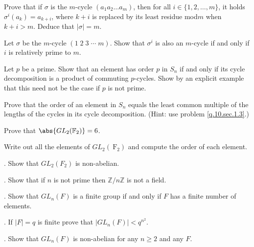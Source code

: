 \begin{questions}
\question\label{q.10.sec.1.3}
Prove that if \(\sigma\) is the \(m\)-cycle \(\left(a_1 a_2 \ldots a_m\right)\), then for all \(i \in\{1,2, \ldots, m\}\), it holds \(\sigma^i\left(a_k\right)=a_{k+i}\), where \(k+i\) is replaced by its least residue mod\;\(m\) when \(k+i>m\). Deduce that \(|\sigma|=m\).

\question
Let \(\sigma\) be the \(m\)-cycle \((1\; 2\; 3\; \cdots\; m)\). Show that \(\sigma^i\) is also an \(m\)-cycle if and only if \(i\) is relatively prime to \(m\).


\question
Let \(p\) be a prime. Show that an element has order \(p\) in \(S_n\) if and only if its cycle decomposition is a product of commuting \(p\)-cycles. Show by an explicit example that this need not be the case if \(p\) is not prime.

\question
Prove that the order of an element in \(S_n\) equals the least common multiple of the lengths of the cycles in its cycle decomposition. (Hint: use problem \ref{q.10.sec.1.3}.)


\question
Prove that \(\abs{GL_2(\mathbb{F}_2)} = 6\).




\question
Write out all the elements of \(G L_2\left(\mathrm{~F}_2\right)\) and compute the order of each element.

. Show that \(G L_2\left(F_2\right)\) is non-abelian.

. Show that if \(n\) is not prime then \(\mathbb{Z} / n \mathbb{Z}\) is not a field.

. Show that \(G L_n(F)\) is a finite group if and only if \(F\) has a finite number of elements.

. If \(|F|=q\) is finite prove that \(\left|G L_n(F)\right|<q^{n^2}\).

. Show that \(G L_n(F)\) is non-abelian for any \(n \geq 2\) and any \(F\).

\hfill\null\par
\hspace*{-1cm}


\end{questions}
